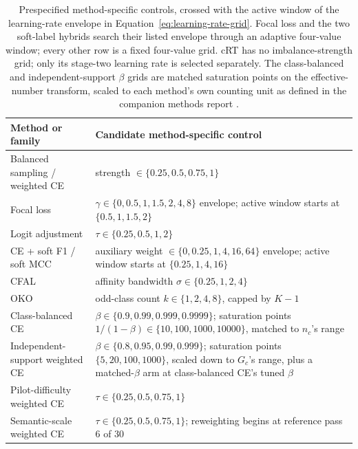 \documentclass[11pt]{article}
\begin{document}
\begin{table}[ht]
  \centering
  \footnotesize
  \begin{tabularx}{\linewidth}{@{}lX@{}}
    \toprule
    Method or family & Candidate method-specific control \\
    \midrule
    Balanced sampling / weighted CE & strength $\in\{0.25,0.5,0.75,1\}$ \\
    Focal loss & $\gamma\in\{0,0.5,1,1.5,2,4,8\}$ envelope; active window starts at $\{0.5,1,1.5,2\}$ \\
    Logit adjustment & $\tau\in\{0.25,0.5,1,2\}$ \\
    CE + soft F1 / soft MCC & auxiliary weight $\in\{0,0.25,1,4,16,64\}$ envelope; active window starts at $\{0.25,1,4,16\}$ \\
    CFAL & affinity bandwidth $\sigma\in\{0.25,1,2,4\}$ \\
    OKO & odd-class count $k\in\{1,2,4,8\}$, capped by $K-1$ \\
    Class-balanced CE & $\beta\in\{0.9,0.99,0.999,0.9999\}$; saturation points $1/(1-\beta)\in\{10,100,1000,10000\}$, matched to $n_c$'s range \\
    Independent-support weighted CE & $\beta\in\{0.8,0.95,0.99,0.999\}$; saturation points $\{5,20,100,1000\}$, scaled down to $G_c$'s range, plus a matched-$\beta$ arm at class-balanced CE's tuned $\beta$ \\
    Pilot-difficulty weighted CE & $\tau\in\{0.25,0.5,0.75,1\}$ \\
    Semantic-scale weighted CE & $\tau\in\{0.25,0.5,0.75,1\}$; reweighting begins at reference pass 6 of 30 \\
    \bottomrule
  \end{tabularx}
  \caption{Prespecified method-specific controls, crossed with the active window of the learning-rate envelope in Equation~\eqref{eq:learning-rate-grid}. Focal loss and the two soft-label hybrids search their listed envelope through an adaptive four-value window; every other row is a fixed four-value grid. cRT has no imbalance-strength grid; only its stage-two learning rate is selected separately. The class-balanced and independent-support $\beta$ grids are matched saturation points on the effective-number transform, scaled to each method's own counting unit as defined in the companion methods report \citep{queisler2026imbalanceMethods}.}
  \label{tab:controls}
\end{table}
\end{document}
